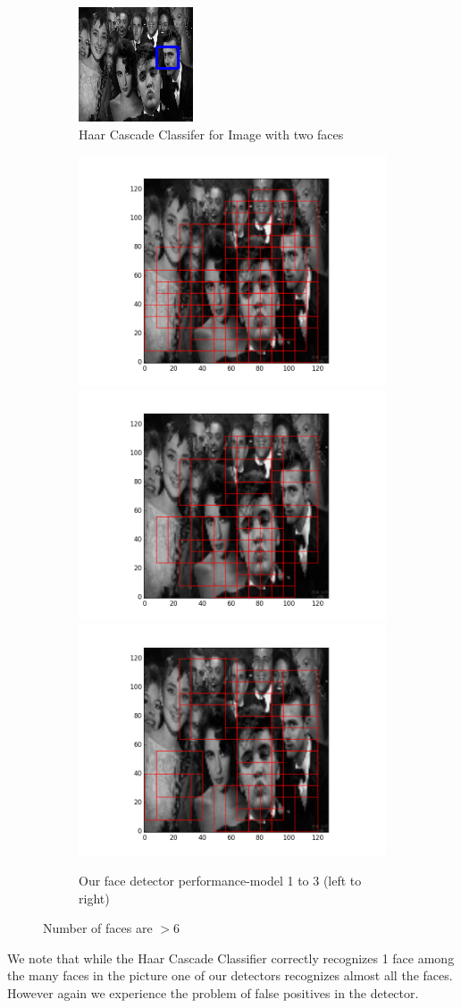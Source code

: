 \documentclass{article}
\begin{document}
\begin{figure}[h!]
  \begin{subfigure}{\linewidth}
  \centering
  \includegraphics[width=.3\linewidth]{twitterhaar.png}\hfill
  \caption{Haar Cascade Classifer for Image with two faces}
  \end{subfigure}\par\medskip
  \begin{subfigure}{\linewidth}
  \includegraphics[width=.3\linewidth]{twitter83.png}\hfill
  \includegraphics[width=.3\linewidth]{twitter91.png}\hfill
  \includegraphics[width=.3\linewidth]{twitter94.png}
  \caption{Our face detector performance-model 1 to 3 (left to right)}
  \end{subfigure}\par\medskip
  \caption{Number of faces are $>$6}
\end{figure}
We note that while the Haar Cascade Classifier correctly recognizes 1 face among the many faces in the picture one of our detectors recognizes almost all the faces. However again we experience the problem of false positives in the detector.
\end{document}
